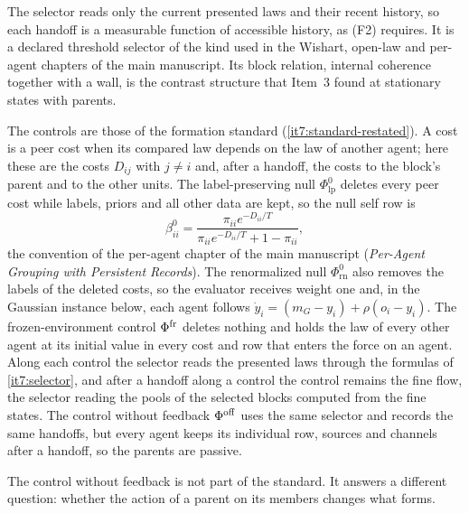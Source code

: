 \documentclass[11pt,letterpaper]{report}
\begin{document}
The selector reads only the current presented laws and their recent history, so each handoff is a measurable function of accessible history, as (F2) requires. It is a declared threshold selector of the kind used in the Wishart, open-law and per-agent chapters of the main manuscript. Its block relation, internal coherence together with a wall, is the contrast structure that Item~3 found at stationary states with parents.

The controls are those of the formation standard (\cref{it7:standard-restated}). A cost is a peer cost when its compared law depends on the law of another agent; here these are the costs $D_{ij}$ with $j\ne i$ and, after a handoff, the costs to the block's parent and to the other units. The label-preserving null $\Phi^0_{\mathrm{lp}}$ deletes every peer cost while labels, priors and all other data are kept, so the null self row is
\begin{equation}
\beta^0_{ii}=\frac{\pi_{ii}e^{-D_{ii}/T}}{\pi_{ii}e^{-D_{ii}/T}+1-\pi_{ii}},
\label{it7:null-row}
\end{equation}
the convention of the per-agent chapter of the main manuscript (\emph{Per-Agent Grouping with Persistent Records}). The renormalized null $\Phi^0_{\mathrm{rn}}$ also removes the labels of the deleted costs, so the evaluator receives weight one and, in the Gaussian instance below, each agent follows $\dot y_i=(m_G-y_i)+\rho(o_i-y_i)$. The frozen-environment control $\Phi^{\rm fr}$ deletes nothing and holds the law of every other agent at its initial value in every cost and row that enters the force on an agent. Along each control the selector reads the presented laws through the formulas of \cref{it7:selector}, and after a handoff along a control the control remains the fine flow, the selector reading the pools of the selected blocks computed from the fine states. The control without feedback $\Phi^{\rm off}$ uses the same selector and records the same handoffs, but every agent keeps its individual row, sources and channels after a handoff, so the parents are passive.

The control without feedback is not part of the standard. It answers a different question: whether the action of a parent on its members changes what forms.
\end{document}
